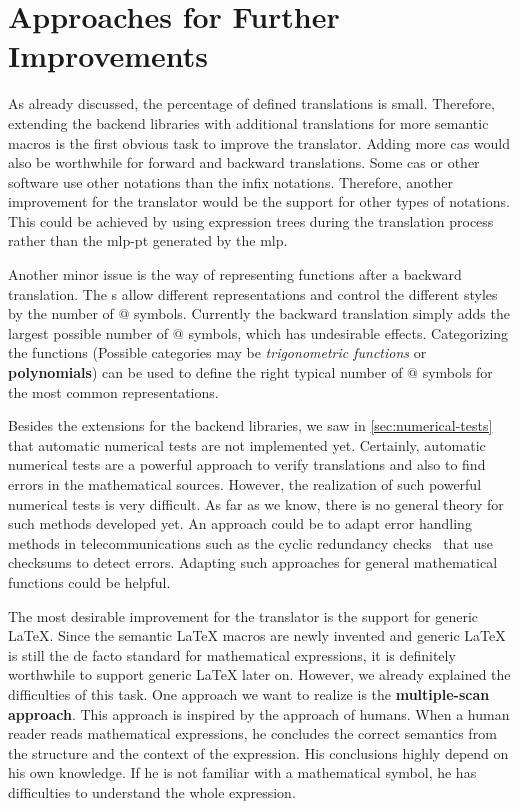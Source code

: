 \section{Approaches for Further Improvements}\label{sec:resolution}
As already discussed, the percentage of defined translations is small. Therefore, extending the backend libraries with additional translations for more semantic macros is the first obvious task to improve the translator. Adding more \gls{cas} would also be worthwhile for forward and backward translations. Some \gls{cas} or other software use other notations than the infix notations. Therefore, another improvement for the translator would be the support for other types of notations. This could be achieved by using expression trees during the translation process rather than the \gls{mlp-pt} generated by the \gls{mlp}.

Another minor issue is the way of representing functions after a backward translation. The \Macro s allow different representations and control the different styles by the number of $@$ symbols. Currently the backward translation simply adds the largest possible number of $@$ symbols, which has undesirable effects. Categorizing the functions (Possible categories may be \textit{trigonometric functions} or \textbf{polynomials}) can be used to define the right typical number of $@$ symbols for the most common representations.

Besides the extensions for the backend libraries, we saw in \cref{sec:numerical-tests} that automatic numerical tests are not implemented yet. Certainly, automatic numerical tests are a powerful approach to verify translations and also to find errors in the mathematical sources. However, the realization of such powerful numerical tests is very difficult. As far as we know, there is no general theory for such methods developed yet. An approach could be to adapt error handling methods in telecommunications such as the cyclic redundancy checks~\cite{CRC} that use checksums to detect errors. Adapting such approaches for general mathematical functions could be helpful.

The most desirable improvement for the translator is the support for generic \LaTeX. Since the semantic \LaTeX{} macros are newly invented and generic \LaTeX{} is still the de facto standard for mathematical expressions, it is definitely worthwhile to support generic \LaTeX{} later on. However, we already explained the difficulties of this task. One approach we want to realize is the \textbf{multiple-scan approach}. This approach is inspired by the approach of humans. When a human reader reads mathematical expressions, he concludes the correct semantics from the structure and the context of the expression. His conclusions highly depend on his own knowledge. If he is not familiar with a mathematical symbol, he has difficulties to understand the whole expression.

